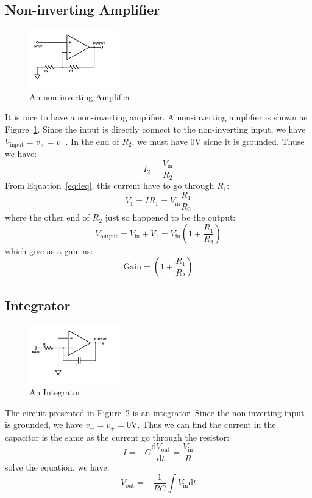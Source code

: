 \documentclass[aps,prl,reprint]{revtex4-1}
\newcommand{\de}{\mathrm{d}}
\begin{document}
    \subsection{Non-inverting Amplifier}
        \begin{figure}[h]
            \centering
            \includegraphics[height=1in]{image/Non-inverting-Amp.pdf}
            \caption{An non-inverting Amplifier}
            \label{fig:nonInvertingAmplifier}
        \end{figure}{}
        It is nice to have a non-inverting amplifier. A non-inverting amplifier is shown as Figure~\ref{fig:nonInvertingAmplifier}. Since the input is directly connect to the non-inverting input, we have $V_\text{input} = v_+ = v_-$. In the end of $R_2$, we must have 0V sicne it is grounded. Thuse we have:
        \[
            I_2 = \frac{V_\text{in}}{R_2}
        \]
        From Equation~\ref{eq:ieq}, this current have to go through $R_1$:
        \[
            V_1 = I R_1 = V_\text{in} \frac{R_1}{R_2}
        \]
        where the other end of $R_2$ just so happened to be the output:
        \begin{equation}
            V_\text{output} = V_\text{in} + V_1 =  V_\text{in} (1+ \frac{R_1}{R_2}) \label{eq:nonInvertingAmplifier}
        \end{equation}
        which give as a gain as:
        \[
            \text{Gain} = (1+ \frac{R_1}{R_2})
        \]

    \subsection{Integrator}
        \begin{figure}[h]
            \centering
            \includegraphics[height=1in]{image/Integrator.pdf}
            \caption{An Integrator}
            \label{fig:integrator}
        \end{figure}{}
        The circuit presented in Figure~\ref{fig:integrator} is an integrator. Since the non-inverting input is grounded, we have $v_- = v_+ = 0$V. Thus we can find the current in the capacitor is the same as the current go through the resistor:
        \[
        I = -C \frac{\de V_\text{out}}{\de t} = \frac{V_\text{in}}{R}
        \]
        solve the equation, we have:
        \begin{equation}
            V_\text{out} = - \frac{1}{RC} \int V_\text{in} \de t \label{eq:integrator}
        \end{equation}
\end{document}

